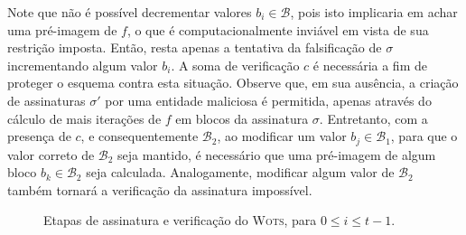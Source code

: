 \documentclass{ufsctex/ufsctex}
\newcommand{\bone}{\mathcal{B}_{1}}
\newcommand{\btwo}{\mathcal{B}_{2}}
\newcommand{\wots}{\textsc{Wots}}
\begin{document}
Note que não é possível decrementar valores $b_{i} \in \mathcal{B}$, pois isto
implicaria em achar uma pré-imagem de $f$, o que é computacionalmente inviável
em vista de sua restrição imposta. Então, resta apenas a tentativa da
falsificação de $\sigma$ incrementando algum valor $b_{i}$. A soma de
verificação $c$ é necessária a fim de proteger o esquema contra esta situação.
Observe que, em sua ausência, a criação de assinaturas $\sigma'$ por uma
entidade maliciosa é permitida, apenas através do cálculo de mais iterações de
$f$ em blocos da assinatura $\sigma$. Entretanto, com a presença de $c$, e
consequentemente $\btwo{}$, ao modificar um valor $b_{j} \in \bone{}$, para que
o valor correto de $\btwo{}$ seja mantido, é necessário que uma pré-imagem de
algum bloco $b_{k} \in \btwo{}$ seja calculada. Analogamente, modificar algum
valor de $\btwo{}$ também tornará a verificação da assinatura impossível.

\begin{figure}
  \centering
  \caption{Etapas de assinatura e verificação do \wots{},
    para $0 \leq i \leq t - 1$.}\label{fig:wots}
\end{figure}
\end{document}
